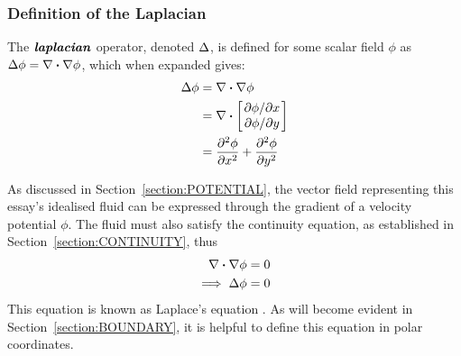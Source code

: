 \subsubsection{Definition of the Laplacian}
\begin{defn}
    The $\textbf{\textit{laplacian}}$ operator, denoted $\Delta$, is defined for some scalar field $\phi$ as $\laplacian\phi=\divergence{\gradient{\phi}}$, which
    when expanded gives:
    \begin{align*}
        \laplacian\phi&=\divergence{\gradient{\phi}}\\
        &=\divergence{\begin{bmatrix}
            \pdv*{\phi}{x}\\
            \pdv*{\phi}{y}
        \end{bmatrix}}\\
        &=\pdv[2]{\phi}{x}+\pdv[2]{\phi}{y}
    \end{align*}
\end{defn}
As discussed in Section~\ref{section:POTENTIAL}, the vector field representing this essay's idealised fluid can be expressed through the gradient of a velocity potential
$\phi$. The fluid must also satisfy the continuity equation, as established in Section~\ref{section:CONTINUITY}, thus
\begin{align*}
    \divergence{\nabla\phi}&=0\\
    \implies\laplacian\phi&=0
\end{align*}
This equation is known as Laplace's equation \cite{LEWIS2022131}. As will become evident in Section~\ref{section:BOUNDARY}, it is helpful to define this equation in polar coordinates.

